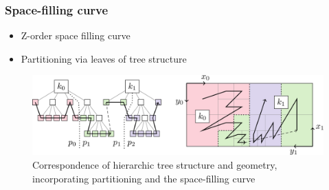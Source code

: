 \begin{frame}
\frametitle{Space-filling curve}

\begin{itemize}
\item Z-order space filling curve
\item Partitioning via leaves of tree structure
\end{itemize}

\vfill{}

\begin{figure}
\includegraphics[width=\textwidth]{addendum/figures/p4est-forest-domain.png}
\caption{Correspondence of hierarchic tree structure and geometry, incorporating partitioning and the space-filling curve}
\end{figure}
\end{frame}